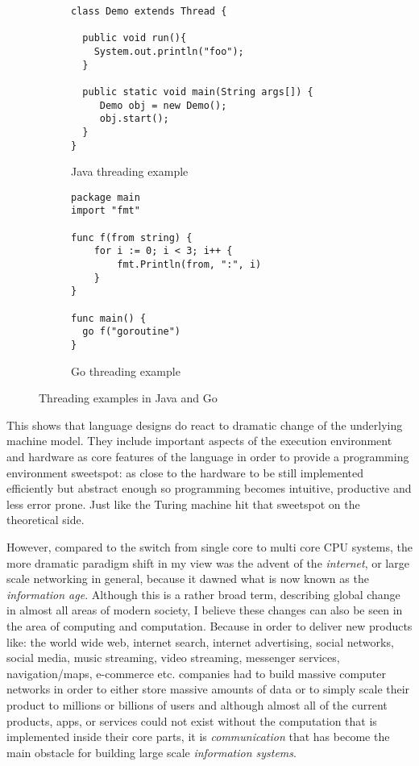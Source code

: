 \begin{figure}[h]
    \begin{subfigure}[b]{0.55\textwidth}

    \begin{lstlisting}
class Demo extends Thread {

  public void run(){
    System.out.println("foo");
  }

  public static void main(String args[]) {
     Demo obj = new Demo();
     obj.start();
  }
}
    \end{lstlisting}

        \caption{Java threading example}
        \label{fig:java-thread}
    \end{subfigure}
    \hfill
    \begin{subfigure}[b]{0.4\textwidth}

    \begin{lstlisting}
package main
import "fmt"

func f(from string) {
    for i := 0; i < 3; i++ {
        fmt.Println(from, ":", i)
    }
}

func main() {
  go f("goroutine")
}

    \end{lstlisting}

        \caption{Go threading example}
        \label{fig:go-thread}
    \end{subfigure}

  \caption{Threading examples in Java and Go}
  \label{thread-examples}

\end{figure}

This shows that language designs do react to dramatic change of the
underlying machine model. They include important aspects of the
execution environment and hardware as core features of the language
in order to provide a programming environment sweetspot: as close
to the hardware to be still implemented efficiently but abstract
enough so programming becomes intuitive, productive and less error prone.
Just like the Turing machine hit that sweetspot on the theoretical side.
\newline

However, compared to the switch from single core to multi core CPU systems,
the more dramatic paradigm shift in my view was the advent of
the \textit{internet}, or large scale networking in general, because it
dawned what is now known as the \textit{information age}. Although this
is a rather broad term, describing global change in almost all areas of
modern society, I believe these changes can also be seen in the area
of computing and computation. Because in order to deliver new products
like: the world wide web, internet search, internet advertising,
social networks, social media, music streaming,
video streaming, messenger services, navigation/maps, e-commerce etc.
companies had to build massive computer networks in order to either store
massive amounts of data or to simply scale their
product to millions or billions of users
and although almost all of the current products, apps, or services
could not exist without the computation that is implemented inside
their core parts, it is \textit{communication} that has become the
main obstacle for building large scale \textit{information systems}.
